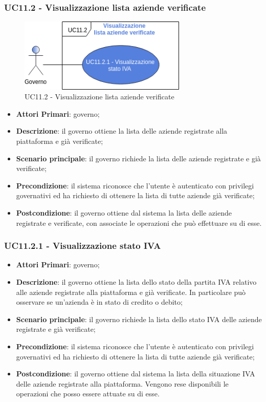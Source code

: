  \subsubsection{UC11.2 - Visualizzazione lista aziende verificate}
  \begin{figure}[h]
 	\includegraphics[width=8cm]{res/images/UC11-2.png} %
 	\centering
 	\caption{UC11.2 - Visualizzazione lista aziende verificate}
 	
 \end{figure}
 \begin{itemize}
	\item \textbf{Attori Primari}: governo;
	\item \textbf{Descrizione}: il governo ottiene la lista delle aziende registrate alla piattaforma e già verificate;
	\item \textbf{Scenario principale}: il governo richiede la lista delle aziende registrate e  già verificate;
	\item \textbf{Precondizione}: il sistema riconosce che l'utente è autenticato con privilegi governativi ed ha richiesto di ottenere la lista di tutte aziende già verificate;
	\item \textbf{Postcondizione}: il governo ottiene dal sistema la lista delle aziende registrate e verificate, con associate le operazioni che può effettuare su di esse.
\end{itemize}
\subsubsection{UC11.2.1 - Visualizzazione stato IVA}
\begin{itemize}
	\item \textbf{Attori Primari}: governo;
	\item \textbf{Descrizione}: il governo ottiene la lista dello stato della partita IVA relativo alle aziende registrate alla piattaforma e già verificate. In particolare può osservare se un'azienda è in stato di credito o debito;
	\item \textbf{Scenario principale}: il governo richiede la lista dello stato IVA delle aziende registrate e  già verificate;
	\item \textbf{Precondizione}: il sistema riconosce che l'utente è autenticato con privilegi governativi ed ha richiesto di ottenere la lista di tutte aziende già verificate;
	\item \textbf{Postcondizione}: il governo ottiene dal sistema la lista della situazione IVA delle aziende registrate alla piattaforma. Vengono rese disponibili le operazioni che posso essere attuate su di esse.
\end{itemize}
